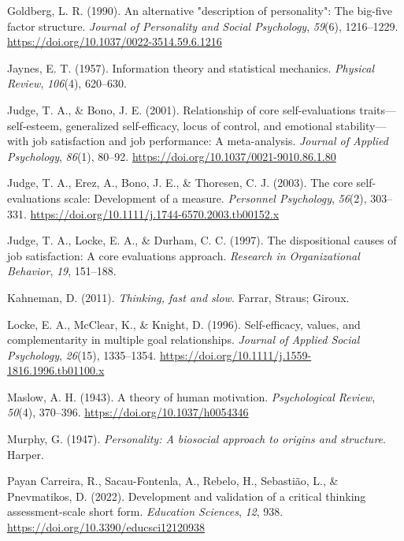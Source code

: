 \documentclass[
  12pt,
  a4paper,
  twoside]{article}
\newlength{\cslhangindent}
\newlength{\cslentryspacingunit} %
\newenvironment{CSLReferences}[2] %
 {%
  \setlength{\parindent}{0pt}
  \ifodd #1
  \let\oldpar\par
  \def\par{\hangindent=\cslhangindent\oldpar}
  \fi
  \setlength{\parskip}{#2\cslentryspacingunit}
 }%
 {}
\begin{document}
\begin{CSLReferences}{1}{0}
\leavevmode{}%
Goldberg, L. R. (1990). An alternative "description of personality": The big-five factor structure. \emph{Journal of Personality and Social Psychology}, \emph{59}(6), 1216--1229. \url{https://doi.org/10.1037/0022-3514.59.6.1216}

\leavevmode{}%
Jaynes, E. T. (1957). Information theory and statistical mechanics. \emph{Physical Review}, \emph{106}(4), 620--630.

\leavevmode{}%
Judge, T. A., \& Bono, J. E. (2001). Relationship of core self-evaluations traits---self-esteem, generalized self-efficacy, locus of control, and emotional stability---with job satisfaction and job performance: A meta-analysis. \emph{Journal of Applied Psychology}, \emph{86}(1), 80--92. \url{https://doi.org/10.1037/0021-9010.86.1.80}

\leavevmode{}%
Judge, T. A., Erez, A., Bono, J. E., \& Thoresen, C. J. (2003). The core self-evaluations scale: Development of a measure. \emph{Personnel Psychology}, \emph{56}(2), 303--331. \url{https://doi.org/10.1111/j.1744-6570.2003.tb00152.x}

\leavevmode{}%
Judge, T. A., Locke, E. A., \& Durham, C. C. (1997). The dispositional causes of job satisfaction: A core evaluations approach. \emph{Research in Organizational Behavior}, \emph{19}, 151--188.

\leavevmode{}%
Kahneman, D. (2011). \emph{Thinking, fast and slow}. Farrar, Straus; Giroux.

\leavevmode{}%
Locke, E. A., McClear, K., \& Knight, D. (1996). Self-efficacy, values, and complementarity in multiple goal relationships. \emph{Journal of Applied Social Psychology}, \emph{26}(15), 1335--1354. \url{https://doi.org/10.1111/j.1559-1816.1996.tb01100.x}

\leavevmode{}%
Maslow, A. H. (1943). A theory of human motivation. \emph{Psychological Review}, \emph{50}(4), 370--396. \url{https://doi.org/10.1037/h0054346}

\leavevmode{}%
Murphy, G. (1947). \emph{Personality: A biosocial approach to origins and structure}. Harper.

\leavevmode{}%
Payan Carreira, R., Sacau-Fontenla, A., Rebelo, H., Sebastião, L., \& Pnevmatikos, D. (2022). Development and validation of a critical thinking assessment-scale short form. \emph{Education Sciences}, \emph{12}, 938. \url{https://doi.org/10.3390/educsci12120938}


\end{CSLReferences}
\end{document}
